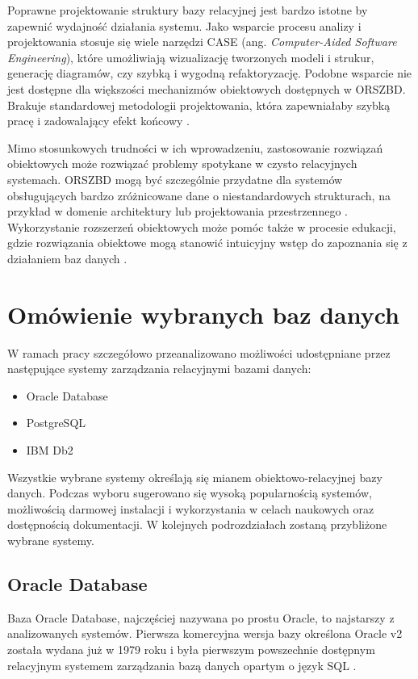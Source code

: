 \documentclass[a4paper,twoside,12pt]{book}
\begin{document}
Poprawne projektowanie struktury bazy relacyjnej jest bardzo istotne by zapewnić wydajność działania systemu. Jako wsparcie procesu analizy i projektowania stosuje się wiele narzędzi CASE (ang. \textit{Computer-Aided Software Engineering}), które umożliwiają wizualizację tworzonych modeli i strukur, generację diagramów, czy szybką i wygodną refaktoryzację. Podobne wsparcie nie jest dostępne dla większości mechanizmów obiektowych dostępnych w ORSZBD. Brakuje standardowej metodologii projektowania, która zapewniałaby szybką pracę i zadowalający efekt końcowy \cite{bib:fundamentals-for-automation-of-ordb-design}.

Mimo stosunkowych trudności w ich wprowadzeniu, zastosowanie rozwiązań obiektowych może rozwiązać problemy spotykane w czysto relacyjnych systemach. ORSZBD mogą być szczególnie przydatne dla systemów obsługujących bardzo zróżnicowane dane o niestandardowych strukturach, na przykład w domenie architektury lub projektowania przestrzennego \cite{bib:OR-IFC-storage-model-based-on-oracle}. Wykorzystanie rozszerzeń obiektowych może pomóc także w procesie edukacji, gdzie rozwiązania obiektowe mogą stanowić intuicyjny wstęp do zapoznania się z działaniem baz danych \cite{bib:solving-relational-DB-problems-with-ORDBMS}.  

\chapter{Omówienie wybranych baz danych}

W ramach pracy szczegółowo przeanalizowano możliwości udostępniane przez następujące systemy zarządzania relacyjnymi bazami danych:
\begin{itemize}
\item Oracle Database
\item PostgreSQL
\item IBM Db2
\end{itemize}

Wszystkie wybrane systemy określają się mianem obiektowo-relacyjnej bazy danych. Podczas wyboru sugerowano się wysoką popularnością systemów, możliwością darmowej instalacji i wykorzystania w celach naukowych oraz dostępnością dokumentacji. W kolejnych podrozdziałach zostaną przybliżone wybrane systemy.

\section{Oracle Database}

Baza Oracle Database, najczęściej nazywana po prostu Oracle, to najstarszy z analizowanych systemów. Pierwsza komercyjna wersja bazy określona Oracle v2 została wydana już w 1979 roku i była pierwszym powszechnie dostępnym relacyjnym systemem zarządzania bazą danych opartym o język SQL \cite{bib:oracle-book}.
\end{document}
